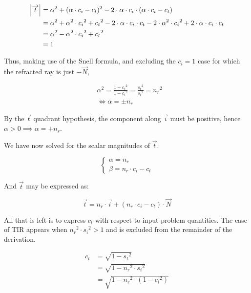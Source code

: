 \begin{equation} \begin{split}
\abs{\overrightarrow{t}} &=
\alpha^2 + (\alpha \cdot c_i - c_t)^2 - 2 \cdot \alpha \cdot c_i \cdot
(\alpha \cdot c_i - c_t) \\
&= \alpha^2 + \alpha^2 \cdot {c_i}^2 + {c_t}^2
- 2 \cdot \alpha \cdot c_i \cdot c_t - 2 \cdot \alpha^2 \cdot {c_i}^2
+ 2 \cdot \alpha \cdot c_i \cdot c_t \\
&= \alpha^2 - \alpha^2 \cdot {c_i}^2 + {c_t}^2 \\
&= 1
\end{split} \end{equation}

Thus, making use of the Snell formula, and excluding the $c_i = 1$ case
for which the refracted ray is just $- \overrightarrow{N}$,

\begin{equation} \begin{split}
& \alpha^2 = \frac{1 - {c_t}^2}{1 - {c_i}^2} = \frac{{s_t}^2}{{s_i}^2} =
  {n_r}^2 \\
& \iff \alpha = \pm n_r
\end{split} \end{equation}

By the $\overrightarrow{t}$ quadrant hypothesis, the component along
$\overrightarrow{i}$ must be positive, hence $\alpha > 0 \implies \alpha = +
n_r$.

We have now solved for the scalar magnitudes of $\overrightarrow{t}$.

\begin{equation} \begin{cases}
\alpha = n_r \\
\beta = n_r \cdot c_i - c_t
\end{cases} \end{equation}

And $\overrightarrow{t}$ may be expressed as:

\begin{equation}
\overrightarrow{t} = n_r \cdot \overrightarrow{i}
 + (n_r \cdot c_i - c_t) \cdot \overrightarrow{N}
\end{equation}

All that is left is to express $c_t$ with respect to input problem quantities.
The case of \gls{TIR} appears when ${n_r}^2 \cdot {s_i}^2 > 1$ and is excluded
from the remainder of the derivation.

\begin{equation} \begin{split}
c_t &= \sqrt{1 - {s_t}^2} \\
&= \sqrt{1 - {n_r}^2 \cdot {s_i}^2} \\
&= \sqrt{1 - {n_r}^2 \cdot (1 - {c_i}^2)}
\end{split} \end{equation}

